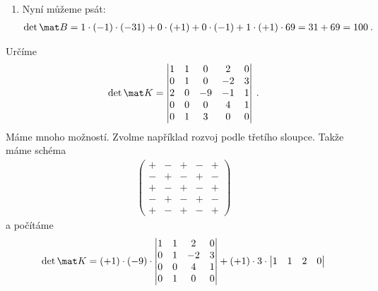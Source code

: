 \begin{itemize}
\begin{example}
\begin{enumerate}
            \item Nyní můžeme psát:
            \begin{align}
                \det \mat B = 1 \cdot (-1) \cdot (-31) +  0\cdot (+1) + 0 \cdot (-1) + 1 \cdot (+1) \cdot 69 = 31 + 69 = 100 \:.
            \end{align}
        \end{enumerate}

    \end{example}

    \begin{example}
        Určíme \begin{align}
            \det \mat K = \left|\begin{matrix}
                1 & 1 & 0 & 2 & 0 \\
                0 & 1 & 0 & -2 & 3 \\
                2 & 0 & -9 & -1 & 1 \\
                0 & 0 & 0 & 4 & 1 \\
                0 & 1 & 3 & 0 & 0
                \end{matrix}\right| \:.
        \end{align}
        Máme mnoho možností. Zvolme například rozvoj podle třetího sloupce. Takže máme schéma \begin{align}
            \begin{pmatrix}
            + & - & \boldsymbol{+} & - & + \\
            - & + & \boldsymbol{-} & + & - \\
            + & - & \boldsymbol{+} & - & + \\
            - & + & \boldsymbol{-} & + & - \\
            + & - & \boldsymbol{+} & - & +
            \end{pmatrix}
        \end{align}
        a počítáme
        \begin{align}
            \det \mat K = (+1) \cdot (-9) \cdot
            \begin{vmatrix}
                1 & 1 & 2 & 0 \\
                0 & 1 & -2 & 3 \\
                0 & 0 & 4 & 1 \\
                0 & 1 & 0 & 0
            \end{vmatrix}
            + (+1) \cdot 3 \cdot
            \begin{vmatrix}
                1 & 1  & 2 & 0 \\

\end{vmatrix}
\end{align}
\end{example}
\end{itemize}
